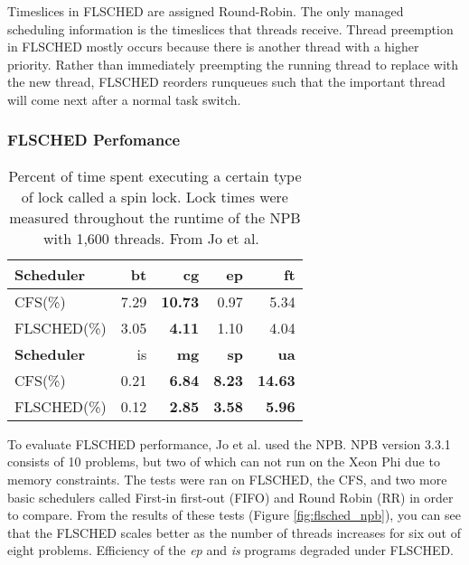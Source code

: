 \documentclass{sig-alternate}
\begin{document}
Timeslices in FLSCHED are assigned Round-Robin. The only managed scheduling information is the timeslices that threads receive. Thread preemption in FLSCHED mostly occurs because there is another thread with a higher priority. Rather than immediately preempting the running thread to replace with the new thread, FLSCHED reorders runqueues such that the important thread will come next after a normal task switch.~\cite{Jo:2017}


\subsubsection{FLSCHED Perfomance}
\label{sec:flsched_performance}


\begin{table}
	\begin{tabular}{| l | r | r | r | r |}
		\hline
		\textbf{Scheduler} & bt & \textbf{cg} & ep & ft \\ \hline
		CFS(\%) & 7.29 & \textbf{10.73} & 0.97 & 5.34 \\
		FLSCHED(\%) & 3.05 & \textbf{4.11} & 1.10 & 4.04 \\ \hline \hline 
		
		\textbf{Scheduler} & is & \textbf{mg} & \textbf{sp} & \textbf{ua} \\ \hline
		CFS(\%) & 0.21 & \textbf{6.84} & \textbf{8.23} & \textbf{14.63} \\
		FLSCHED(\%) & 0.12 & \textbf{2.85} & \textbf{3.58} & \textbf{5.96} \\ \hline
		
		\hline
	\end{tabular}
	\caption{ Percent of time spent executing a certain type of lock called a spin lock. Lock times were measured throughout the runtime of the NPB with 1,600 threads. From Jo et al.~\cite{Jo:2017}}
	\label{fig:flsched_spinlock}
\end{table}


\begin{figure*}
	\centering
	\caption{FLSCHED performance comparison of various schedulers on programs in the NAS Parallel Benchmark. From Jo et al.~\cite{Jo:2017}}
	\label{fig:flsched_npb}
\end{figure*}

 To evaluate FLSCHED performance, Jo et al. used the NPB. NPB version 3.3.1 consists of 10 problems, but two of which can not run on the Xeon Phi due to memory constraints. The tests were ran on FLSCHED, the CFS, and two more basic schedulers called First-in first-out (FIFO) and Round Robin (RR) in order to compare. From the results of these tests (Figure \ref{fig:flsched_npb}), you can see that the FLSCHED scales better as the number of threads increases for six out of eight problems. Efficiency of the \textit{ep} and \textit{is} programs degraded under FLSCHED.~\cite{Jo:2017}
\end{document}
